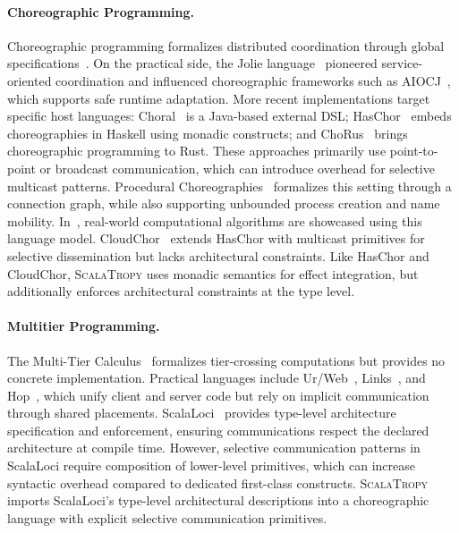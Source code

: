 \documentclass[runningheads]{llncs}
\newcommand{\ourLang}{\textsc{ScalaTropy}}
\newcommand{\diff}[1]{{#1}}
\begin{document}
\paragraph{Choreographic Programming.}
\sloppypar
Choreographic programming formalizes distributed coordination through global specifications~\cite{10.1145/2480359.2429101}.
%
On the practical side, the Jolie language~\cite{DBLP:books/sp/wsf14/MontesiGZ14} pioneered service-oriented coordination and influenced choreographic frameworks such as AIOCJ~\cite{dalla2017dynamic}, which supports safe runtime adaptation.
%
More recent implementations target specific host languages: Choral~\cite{10.1145/3632398} is a Java-based external DSL;
HasChor~\cite{10.1145/3607849} embeds choreographies in Haskell using monadic constructs;
and ChoRus~\cite{kashiwa2024chorus} brings choreographic programming to Rust.
%
These approaches primarily use point-to-point or broadcast communication, which can introduce overhead for selective multicast patterns.
%
\diff{Procedural Choreographies~\cite{CruzFilipe2017} formalizes this setting through a connection graph, while also supporting unbounded process creation and name mobility. In~\cite{CruzFilipe2016}, real-world computational algorithms are showcased using this language model.}
%
CloudChor~\cite{DBLP:conf/pepm/IonescuR26} extends HasChor with multicast primitives for selective dissemination but lacks architectural constraints.
%
Like HasChor and CloudChor, \ourLang{} uses monadic semantics for effect integration, but additionally enforces architectural constraints at the type level.

\paragraph{Multitier Programming.}
The Multi-Tier Calculus~\cite{10.1145/1040305.1040324} formalizes tier-crossing computations but provides no concrete implementation.
%
Practical languages include Ur/Web~\cite{10.1145/2775051.2677004}, Links~\cite{DBLP:conf/fmco/CooperLWY06}, and Hop~\cite{DBLP:conf/oopsla/SerranoGL06},
which unify client and server code but rely on implicit communication through shared placements.
%
ScalaLoci~\cite{DBLP:journals/pacmpl/WeisenburgerKS18} provides type-level architecture specification and enforcement, ensuring communications respect the declared architecture at compile time.
%
However, selective communication patterns in ScalaLoci require composition of lower-level primitives, 
which can increase syntactic overhead compared to dedicated first-class constructs.
%
\ourLang{} \diff{imports} ScalaLoci's \diff{type-level} architectural \diff{descriptions into a choreographic language} with explicit selective communication primitives.
\end{document}
